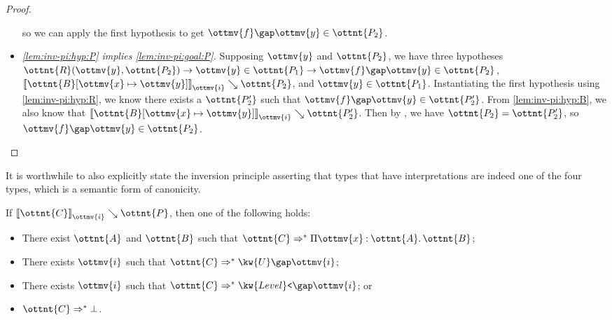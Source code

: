 \documentclass[a4paper,UKenglish,cleveref,autoref,thm-restate]{lipics-v2021}
\begin{document}
\begin{proof}
\begin{itemize}
      so we can apply the first hypothesis to get $  \ottmv{f}  \gap  \ottmv{y}   \in  \ottnt{P_{{\mathrm{2}}}} $.
    \item \textit{\ref{lem:inv-pi:hyp:P} implies \ref{lem:inv-pi:goal:P}.}
      Supposing $\ottmv{y}$ and $\ottnt{P_{{\mathrm{2}}}}$,
      we have three hypotheses $   \ottnt{R} ( \ottmv{y} ,  \ottnt{P_{{\mathrm{2}}}} )   \to   \ottmv{y}  \in  \ottnt{P_{{\mathrm{1}}}}    \to    \ottmv{f}  \gap  \ottmv{y}   \in  \ottnt{P_{{\mathrm{2}}}}  $,
      $ \mathopen{\llbracket}   \ottnt{B} [  \ottmv{x}  \mapsto  \ottmv{y}  ]   \mathclose{\rrbracket}_{ \ottmv{i} } \searrow  \ottnt{P_{{\mathrm{2}}}} $, and $ \ottmv{y}  \in  \ottnt{P_{{\mathrm{1}}}} $.
      Instantiating the first hypothesis using \ref{lem:inv-pi:hyp:R},
      we know there exists a $\ottnt{P'_{{\mathrm{2}}}}$ such that $  \ottmv{f}  \gap  \ottmv{y}   \in  \ottnt{P'_{{\mathrm{2}}}} $.
      From \ref{lem:inv-pi:hyp:B}, we also know that $ \mathopen{\llbracket}   \ottnt{B} [  \ottmv{x}  \mapsto  \ottmv{y}  ]   \mathclose{\rrbracket}_{ \ottmv{i} } \searrow  \ottnt{P'_{{\mathrm{2}}}} $.
      Then by , we have $\ottnt{P_{{\mathrm{2}}}} = \ottnt{P'_{{\mathrm{2}}}}$, so $  \ottmv{f}  \gap  \ottmv{y}   \in  \ottnt{P_{{\mathrm{2}}}} $.
  \end{itemize}
\end{proof}

It is worthwhile to also explicitly state the inversion principle
asserting that types that have interpretations are indeed one of the four types,
which is a semantic form of canonicity.

\begin{lemma}[Inversion (l.r.)]
  If $ \mathopen{\llbracket}  \ottnt{C}  \mathclose{\rrbracket}_{ \ottmv{i} } \searrow  \ottnt{P} $, then one of the following holds:
  \begin{itemize}
    \item There exist $\ottnt{A}$ and $\ottnt{B}$ such that $ \ottnt{C}  \Rightarrow^\ast   \Pi  \ottmv{x}  \mathbin{:}  \ottnt{A}  \mathpunct{.}  \ottnt{B}  $;
    \item There exists $\ottmv{i}$ such that $ \ottnt{C}  \Rightarrow^\ast   \kw{U} \gap   \ottmv{i}   $;
    \item There exists $\ottmv{i}$ such that $ \ottnt{C}  \Rightarrow^\ast   \kw{Level}\texttt{<} \gap   \ottmv{i}   $; or
    \item $ \ottnt{C}  \Rightarrow^\ast   \bot  $.
  \end{itemize}
\end{lemma}
\end{document}
